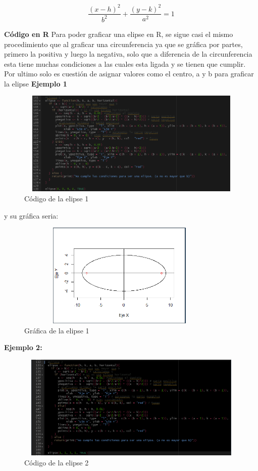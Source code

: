 \documentclass{article}
\begin{document}
\begin{equation}
    \frac{(x-h)^2}{b^2} + \frac{(y-k)^2}{a^2} = 1
\end{equation}

\textbf{Código en R}
\newline Para poder graficar una elipse en R, se sigue casi el mismo procedimiento que al graficar una circunferencia ya que se gráfica por partes, primero la positiva y luego la negativa, solo que a diferencia de la circunferencia esta tiene muchas condiciones a las cuales esta ligada y se tienen que cumplir.
Por ultimo solo es cuestión de asignar valores como el centro, a y b para graficar la elipse
\newline
\textbf{Ejemplo 1}

\begin{figure}[h]
    \centering
    \includegraphics[width=12cm, height=5cm]{Codigoelipse1}
    \caption{Código de la elipse 1}
    \label{fig:mesh13}
\end{figure}
y su gráfica seria:
\begin{figure}[ht]
    \centering
    \includegraphics[width=10cm, height=5cm]{Grafica7}
    \caption{Gráfica de la elipse 1}
    \label{fig:mesh14}
\end{figure}

\newpage
\textbf{Ejemplo 2:}
\begin{figure}[h]
    \centering
    \includegraphics[width=12cm, height=5cm]{Codigoelipse2}
    \caption{Código de la elipse 2}
    \label{fig:mesh15}
\end{figure}
\end{document}
